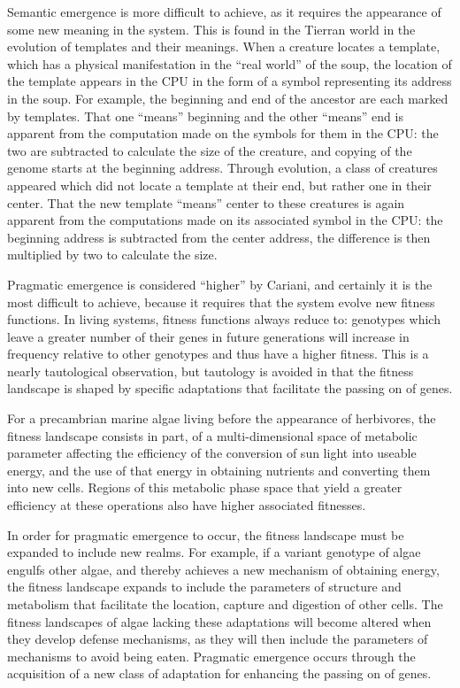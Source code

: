 Semantic emergence is more difficult to achieve, as it requires the appearance
of some new meaning in the system.  This is found in the Tierran world in
the evolution of templates and their meanings.  When a creature
locates a template, which has a physical manifestation in the ``real world''
of the soup, the location of the template appears in the CPU in the form of
a symbol representing its address in the soup.  For example, the
beginning and end of the ancestor are each marked by templates.  That one
``means'' beginning and the other ``means'' end is apparent from the
computation made on the symbols for them in the CPU: the two are subtracted to
calculate the size of the creature, and copying of the genome starts at
the beginning address.  Through evolution, a class of creatures
appeared which did not locate a template at their end, but rather one in
their center.  That the new template ``means'' center to these creatures
is again apparent from the computations made on its associated symbol
in the CPU: the beginning address is subtracted from the center address,
the difference is then multiplied by two to calculate the size.

Pragmatic emergence is considered ``higher'' by Cariani, and certainly it is
the most difficult to achieve, because it requires that the system evolve
new fitness functions.  In living systems, fitness functions always
reduce to: genotypes which leave a greater number of their genes in future
generations will increase in frequency relative to other genotypes and thus
have a higher fitness.  This is a nearly tautological observation, but
tautology is avoided in that the fitness landscape is shaped by specific
adaptations that facilitate the passing on of genes.

For a precambrian marine algae living before the appearance of herbivores,
the fitness landscape consists in part, of a multi-dimensional space of
metabolic parameter affecting the efficiency of the conversion of sun light
into useable energy, and the use of that energy in obtaining nutrients and
converting them into new cells.  Regions of this metabolic phase space that
yield a greater efficiency at these operations also have higher associated
fitnesses.

In order for pragmatic emergence to occur, the fitness landscape must be
expanded to include new realms.  For example, if a variant genotype of algae
engulfs other algae, and thereby achieves a new mechanism of obtaining
energy, the fitness landscape expands to include the parameters of
structure and metabolism that facilitate the location, capture and digestion
of other cells.  The fitness landscapes of algae lacking these adaptations
will become altered when they develop defense mechanisms, as they will then
include the parameters of mechanisms to avoid being eaten.  Pragmatic
emergence occurs through the acquisition of a new class of adaptation for
enhancing the passing on of genes.

